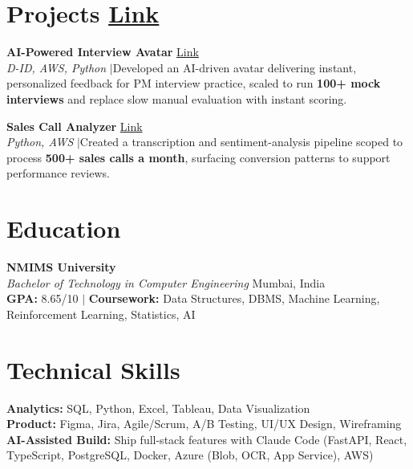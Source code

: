 \documentclass[10pt,a4paper]{article}
\begin{document}
\section*{Projects \hfill \href{https://drive.google.com/drive/folders/17vY-GTSW6fjwtsw_C7kP6qBovaq7O92Q?usp=drive_link}{\textbf{Link}}}

\textbf{AI-Powered Interview Avatar} \hfill \href{https://drive.google.com/file/d/1fjRAZmYXzmSp31axSDShe0Rf3vGgNNiD/view?usp=drive_link}{Link} \\
\textit{D-ID, AWS, Python} \enspace$|$\enspace Developed an AI-driven avatar delivering instant, personalized feedback for PM interview practice, scaled to run \textbf{100+ mock interviews} and replace slow manual evaluation with instant scoring.

\textbf{Sales Call Analyzer} \hfill \href{https://drive.google.com/drive/folders/1mL1ruHUnihtOwtLM7-f5mVFrqnglRMEI}{Link} \\
\textit{Python, AWS} \enspace$|$\enspace Created a transcription and sentiment-analysis pipeline scoped to process \textbf{500+ sales calls a month}, surfacing conversion patterns to support performance reviews.

\section*{Education}
\textbf{NMIMS University} \hfill \\
\textit{Bachelor of Technology in Computer Engineering} \hfill Mumbai, India \\
\textbf{GPA:} 8.65/10 \quad $|$ \quad \textbf{Coursework:} Data Structures, DBMS, Machine Learning, Reinforcement Learning, Statistics, AI

\section*{Technical Skills}
\textbf{Analytics:} SQL, Python, Excel, Tableau, Data Visualization \\
\textbf{Product:} Figma, Jira, Agile/Scrum, A/B Testing, UI/UX Design, Wireframing \\
\textbf{AI-Assisted Build:} Ship full-stack features with Claude Code (FastAPI, React, TypeScript, PostgreSQL, Docker, Azure (Blob, OCR, App Service), AWS)
\end{document}
